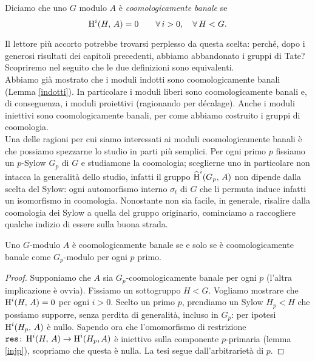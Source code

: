 \begin{definition}
	Diciamo che uno $ G $ modulo $ A $ è \emph{coomologicamente banale} se
	$$  \operatorname{H}^i(H, \, A) = 0 \qquad \forall \, i > 0, \quad  \forall \, H < G.  $$
\end{definition}

Il lettore più accorto potrebbe trovarsi perplesso da questa scelta: perché, dopo i generosi risultati dei capitoli precedenti, abbiamo abbandonato i gruppi di Tate? Scopriremo nel seguito che le due definizioni sono equivalenti. \\

Abbiamo già mostrato che i moduli indotti sono coomologicamente banali (Lemma \ref{indotti}). In particolare i moduli liberi sono coomologicamente banali e, di conseguenza, i moduli proiettivi (ragionando per décalage). Anche i moduli iniettivi sono coomologicamente banali, per come abbiamo costruito i gruppi di coomologia. \\

Una delle ragioni per cui siamo interessati ai moduli coomologicamente banali è che possiamo spezzarne lo studio in parti più semplici. Per ogni primo $ p $ fissiamo un $ p $-Sylow $ G_p $ di $ G $ e studiamone la coomologia; sceglierne uno in particolare non intacca la generalità dello studio, infatti il gruppo $ \operatorname{\widehat{H}}^i(G_p, \, A) $ non dipende dalla scelta del Sylow: ogni automorfismo interno $ \sigma_t $ di $ G $ che li permuta induce infatti un isomorfismo in coomologia. Nonostante non sia facile, in generale, risalire dalla coomologia dei Sylow a quella del gruppo originario, cominciamo a raccogliere qualche indizio di essere sulla buona strada.

\begin{lemma}\label{banSylow}
	Uno $ G $-modulo $ A $ è coomologicamente banale se e solo se è coomologicamente banale come $ G_p $-modulo per ogni $ p $ primo.
\end{lemma}
\begin{proof}
	Supponiamo che $ A $ sia $ G_p $-coomologicamente banale per ogni $ p $ (l'altra implicazione è ovvia). Fissiamo un sottogruppo $ H < G $. Vogliamo mostrare che
	$  \operatorname{H}^i(H, \, A) = 0 $ per ogni $ i > 0 $. Scelto un primo $ p $, prendiamo un Sylow $ H_p < H $ che possiamo supporre, senza perdita di generalità, incluso in $ G_p $: per ipotesi $ \operatorname{H}^i(H_p, \, A) $ è nullo.
	Sapendo ora che l'omomorfismo di restrizione $ \operatorname{\mathtt{res}} \colon \operatorname{H}^i(H, \, A) \to \operatorname{H}^i(H_p, A) $ è iniettivo sulla componente $ p $-primaria (lemma \ref{injp}), scopriamo che questa è nulla. La tesi segue dall'arbitrarietà di $ p $.
	
\end{proof}

